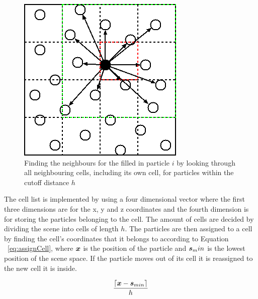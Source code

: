     \begin{figure}[h!]\centering
    \begin{centering}
    \includegraphics[width=0.7\linewidth]{img/CellList.png}
    \caption{Finding the neighbours for the filled in particle $i$ by looking through all neighbouring cells, including its own cell, for particles within the cutoff distance $h$}
    \label{fig:cellList}
    \end{centering}
    \end{figure}

    The cell list is implemented by using a four dimensional vector where the first three dimensions are for the x, y and z coordinates and the fourth dimension is for storing the particles belonging to the cell.
    The amount of cells are decided by dividing the scene into cells of length $h$.
    The particles are then assigned to a cell by finding the cell's coordinates that it belongs to according to Equation ~\ref{eq:assignCell}, where $\bm{x}$ is the position of the particle and $\bm{s}_min$ is the lowest position of the scene space.
    If the particle moves out of its cell it is reassigned to the new cell it is inside.

    \begin{equation} \label{eq:assignCell}
        \frac{\lceil{\bm{x} - \bm{s}_{min}}\rceil}{h}
    \end{equation}

